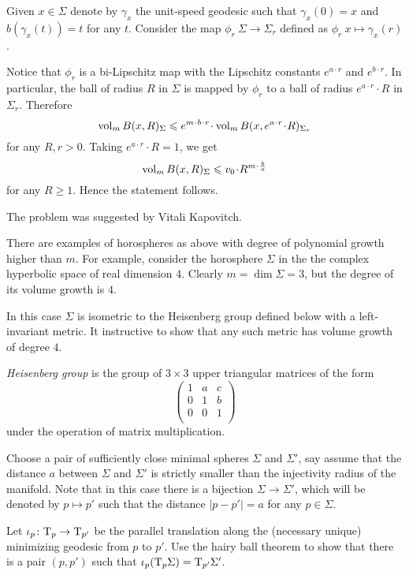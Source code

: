 Given $x\in \Sigma$ denote by $\gamma_x$ 
the unit-speed geodesic
such that $\gamma_x(0)=x$ and $b(\gamma_x(t))=t$ for any $t$.
Consider the map $\phi_{r}\:\Sigma\to\Sigma_r$ defined as
$\phi_r\:x\mapsto \gamma_x(r)$.

Notice that $\phi_r$ is a bi-Lipschitz map with the Lipschitz constants $e^{a\cdot r}$ and $e^{b\cdot r}$.
In particular, the ball of radius $R$ in $\Sigma$ is mapped by $\phi_r$
to a ball of radius $e^{a\cdot r}\cdot R$ in $\Sigma_r$.
Therefore
\[\vol_m B(x,R)_\Sigma\le e^{m\cdot b\cdot r}\cdot \vol_m B(x,e^{a\cdot r}\cdot R)_{\Sigma_r}\]
for any $R,r>0$.
Taking $e^{a\cdot r}\cdot R=1$, we get
\[\vol_m B(x,R)_\Sigma\le v_0\cdot R^{m\cdot \frac ba}\]
for any $R\ge1$. 
Hence the statement follows.
\qedsf

The problem was suggested by Vitali Kapovitch.

There are examples of horospheres as above with degree of polynomial growth higher than $m$.
For example, consider the horosphere $\Sigma$ in the
the complex hyperbolic space 
of real dimension $4$.
Clearly $m=\dim \Sigma=3$, but the degree of its volume growth is $4$.

In this case $\Sigma$ is isometric to the Heisenberg group defined below with a left-invariant metric.
It instructive to show that any such metric has volume  growth of degree $4$.

\emph{Heisenberg group}
is the group of $3\times3$ upper triangular matrices of the form
\[\begin{pmatrix}
 1 & a & c\\
 0 & 1 & b\\
 0 & 0 & 1\\
\end{pmatrix}\]
under the operation of matrix multiplication. 
                                                      



Choose a pair of sufficiently close minimal spheres $\Sigma$ and $\Sigma'$,
say assume that the distance $a$ between $\Sigma$ and $\Sigma'$ is strictly smaller than the injectivity radius of the manifold.
Note that in this case there is a bijection $\Sigma\to \Sigma'$, which will be denoted by $p\mapsto p'$ such that the distance $|p-p'|=a$ for any $p\in\Sigma$.

Let $\iota_p\colon\mathrm{T}_p\to\mathrm{T}_{p'}$ be the parallel translation along the (necessary unique) minimizing geodesic from $p$ to $p'$.
Use the hairy ball theorem 
to show that there is a pair $(p,p')$ such that $\iota_p(\mathrm{T}_p\Sigma)=\mathrm{T}_{p'}\Sigma'$.

